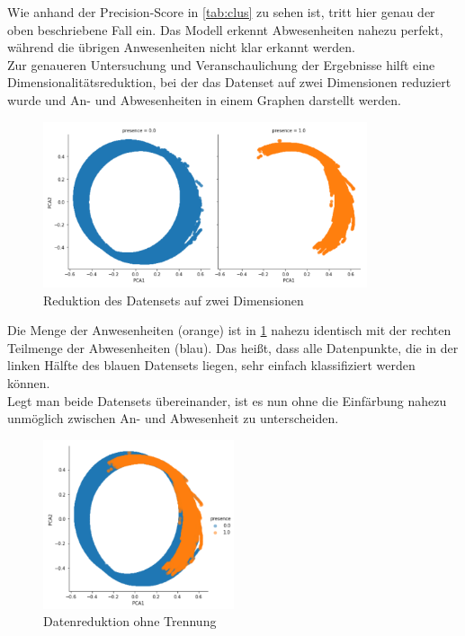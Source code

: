 Wie anhand der Precision-Score in \ref{tab:clus} zu sehen ist, tritt hier genau der oben beschriebene Fall ein.
Das Modell erkennt Abwesenheiten nahezu perfekt, während die übrigen Anwesenheiten nicht klar erkannt werden.\\
\newpage
Zur genaueren Untersuchung und Veranschaulichung der Ergebnisse hilft eine Dimensionalitätsreduktion, 
bei der das Datenset auf zwei Dimensionen reduziert wurde und An- und Abwesenheiten in einem Graphen darstellt werden.

\begin{figure}[h]
    \centering
    \includegraphics[width=0.85\textwidth]{pic/pca.png}
    \caption{Reduktion des Datensets auf zwei Dimensionen}
    \label{fig:pca}
\end{figure}

Die Menge der Anwesenheiten (orange) ist in \ref{fig:pca} nahezu identisch mit der rechten Teilmenge der 
Abwesenheiten (blau). 
Das heißt, dass alle Datenpunkte, die in der linken Hälfte des blauen Datensets liegen, sehr einfach klassifiziert 
werden können.\\
Legt man beide Datensets übereinander, ist es nun ohne die Einfärbung nahezu unmöglich zwischen An- und 
Abwesenheit zu unterscheiden.\\

\begin{figure}[h]
    \centering
    \includegraphics[width=0.5\textwidth]{pic/pca1.png}
    \caption{Datenreduktion ohne Trennung}
    \label{fig:pca1}
\end{figure}


